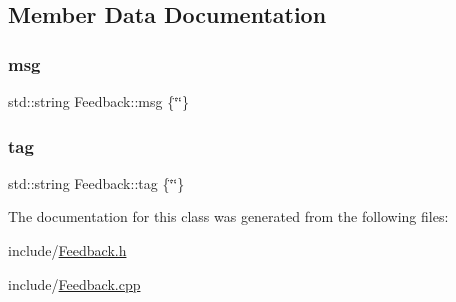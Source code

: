\subsection{Member Data Documentation}
\hypertarget{class_feedback_a0efc7aed727a0c74948551edfe91c36b}{}\label{class_feedback_a0efc7aed727a0c74948551edfe91c36b} 
\subsubsection{\texorpdfstring{msg}{msg}}
{\footnotesize\ttfamily std\+::string Feedback\+::msg \{\char`\"{}\char`\"{}\}}

\hypertarget{class_feedback_ae28edf8cd337af9d9de4148ce31a8c44}{}\label{class_feedback_ae28edf8cd337af9d9de4148ce31a8c44} 
\subsubsection{\texorpdfstring{tag}{tag}}
{\footnotesize\ttfamily std\+::string Feedback\+::tag \{\char`\"{}\char`\"{}\}}



The documentation for this class was generated from the following files\+:\begin{DoxyCompactItemize}
\item 
include/\hyperlink{_feedback_8h}{Feedback.\+h}\item 
include/\hyperlink{_feedback_8cpp}{Feedback.\+cpp}\end{DoxyCompactItemize}
